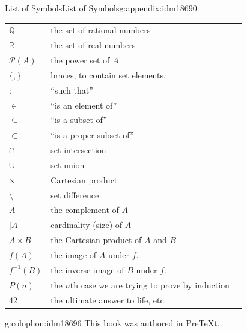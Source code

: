 \documentclass[oneside,10pt,]{book}
\numberwithin{equation}{chapter}
\def\Q{\mathbb Q}
\def\R{\mathbb R}
\def\pow{\mathcal P}
\def\inv{^{-1}}
\def\st{:}
\newcommand{\card}[1]{\left| #1 \right|}
\begin{document}
\begin{appendixptx}{List of Symbols}{}{List of Symbols}{}{}{g:appendix:idm18690}
\begin{longtable}[l]{lp{}r}
\(\Q\)&the set of rational numbers&\pageref{g:notation:idm13129}\\
\(\R\)&the set of real numbers&\pageref{g:notation:idm13140}\\
\(\pow(A)\)&the power set of \(A\)&\pageref{g:notation:idm13152}\\
\(\{, \}\)&braces, to contain set elements.&\pageref{g:notation:idm13166}\\
\(\st\)&``such that''&\pageref{g:notation:idm13177}\\
\(\in\)&``is an element of''&\pageref{g:notation:idm13188}\\
\(\subseteq\)&``is a subset of''&\pageref{g:notation:idm13209}\\
\( \subset\)&``is a proper subset of''&\pageref{g:notation:idm13224}\\
\(\cap\)&set intersection&\pageref{g:notation:idm13238}\\
\(\cup\)&set union&\pageref{g:notation:idm13253}\\
\(\times\)&Cartesian product&\pageref{g:notation:idm13269}\\
\(\setminus\)&set difference&\pageref{g:notation:idm13282}\\
\(\overline{A}\)&the complement of \(A\)&\pageref{g:notation:idm13292}\\
\(\card{A}\)&cardinality (size) of \(A\)&\pageref{g:notation:idm13303}\\
\(A\times B\)&the Cartesian product of \(A\) and \(B\)&\pageref{g:notation:idm13685}\\
\(f(A)\)&the image of \(A\) under \(f\).&\pageref{g:notation:idm14470}\\
\(f\inv(B)\)&the inverse image of \(B\) under \(f\).&\pageref{g:notation:idm14485}\\
\(P(n)\)&the \(n\)th case we are trying to prove by induction&\pageref{g:notation:idm17457}\\
\(42\)&the ultimate answer to life, etc.&\pageref{g:notation:idm17494}\\
\end{longtable}
\end{appendixptx}
%
\backmatter
%
%
\renewcommand{\leftmark}{Index}
\printindex
%
\cleardoublepage
\pagestyle{empty}
\begin{backcolophon}{g:colophon:idm18696}%
This book was authored in PreTeXt.%
\end{backcolophon}%
\end{document}
